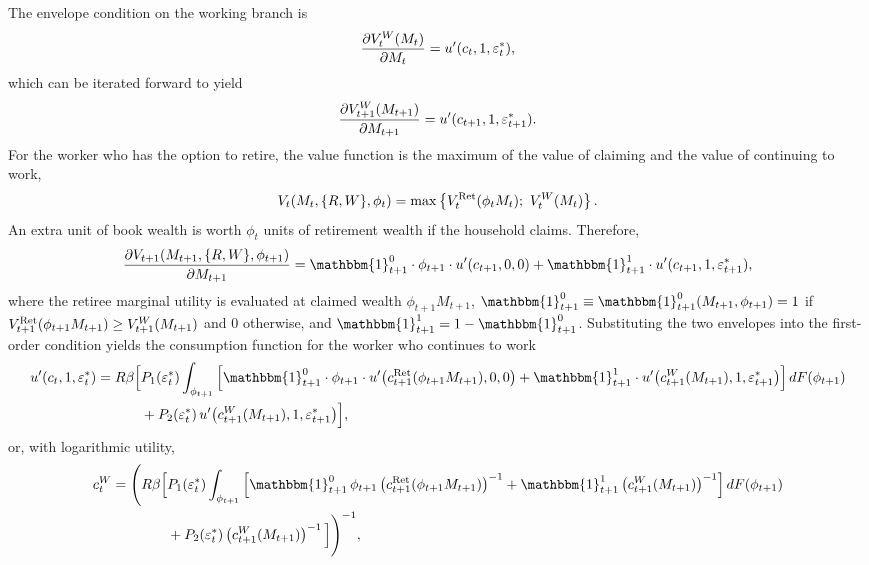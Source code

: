 The envelope condition on the working branch is
\begin{equation}
\frac{\partial V_t^{W}(M_t)}{\partial M_t} = u'(c_t, 1, \varepsilon_t^*),
\end{equation}
which can be iterated forward to yield
\begin{equation}
\frac{\partial V_{t+1}^{W}(M_{t+1})}{\partial M_{t+1}} = u'(c_{t+1}, 1, \varepsilon_{t+1}^*).
\end{equation}
For the worker who has the option to retire, the value function is the maximum of the
value of claiming and the value of continuing to work,
\begin{equation}
V_t(M_t, \{R, W\}, \phi_t) = \max \left\{ V_t^{\mathrm{Ret}}(\phi_t M_t);\ V_t^{W}(M_t) \right\}.
\end{equation}
An extra unit of book wealth is worth $\phi_t$ units of retirement wealth if the household
claims. Therefore,
\begin{equation}
\frac{\partial V_{t+1}(M_{t+1}, \{R, W\}, \phi_{t+1})}{\partial M_{t+1}}
= \mathbbm{1}_{t+1}^0 \cdot \phi_{t+1} \cdot u'(c_{t+1}, 0, 0)
+ \mathbbm{1}_{t+1}^1 \cdot u'(c_{t+1}, 1, \eff_{t+1}^*),
\end{equation}
where the retiree marginal utility is evaluated at claimed wealth $\phi_{t+1} M_{t+1}$,
$\mathbbm{1}_{t+1}^0 \equiv \mathbbm{1}_{t+1}^0(M_{t+1}, \phi_{t+1}) = 1$ if
$V_{t+1}^{\mathrm{Ret}}(\phi_{t+1} M_{t+1}) \ge V_{t+1}^{W}(M_{t+1})$ and $0$ otherwise, and
$\mathbbm{1}_{t+1}^1 = 1 - \mathbbm{1}_{t+1}^0$. Substituting the two envelopes into the
first-order condition yields the consumption function for the worker who continues to work
\begin{equation}
\begin{aligned}
u'(c_t, 1, \eff_t^*) = R \beta \Big[
&P_1(\eff_t^*) \int_{\phi_{t+1}}
\left[ \mathbbm{1}_{t+1}^0 \cdot \phi_{t+1} \cdot u'\bigl(c_{t+1}^{\Ret}(\phi_{t+1} M_{t+1}), 0, 0\bigr)
+ \mathbbm{1}_{t+1}^1 \cdot u'\bigl(c_{t+1}^{W}(M_{t+1}), 1, \eff_{t+1}^*\bigr) \right]
dF(\phi_{t+1}) \\
&+ P_2(\eff_t^*) \,
u'\bigl(c_{t+1}^{W}(M_{t+1}), 1, \eff_{t+1}^*\bigr)
\Big],
\end{aligned}
\end{equation}
or, with logarithmic utility,
\begin{equation}
\begin{aligned}
c_t^{W} = \Bigg( R \beta \Big[
&P_1(\eff_t^*) \int_{\phi_{t+1}}
\left[ \mathbbm{1}_{t+1}^0 \, \phi_{t+1} \left( c_{t+1}^{\Ret}(\phi_{t+1} M_{t+1}) \right)^{-1}
+ \mathbbm{1}_{t+1}^1 \left( c_{t+1}^{W}(M_{t+1}) \right)^{-1} \right]
dF(\phi_{t+1}) \\
&+ P_2(\eff_t^*)
\left( c_{t+1}^{W}(M_{t+1}) \right)^{-1}
\Big] \Bigg)^{-1},
\end{aligned}
\label{eq:ret_worker_c}
\end{equation}
